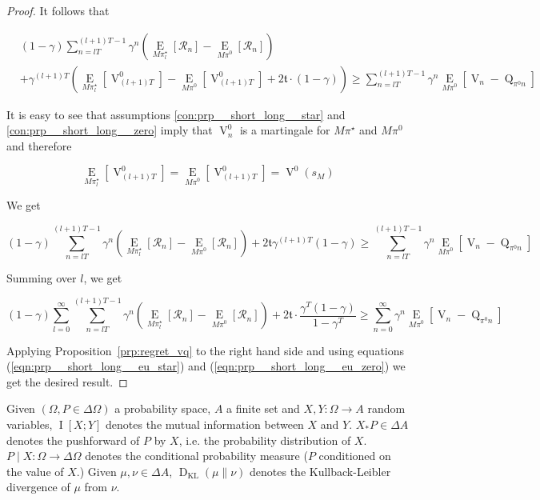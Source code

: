 \documentclass[anon,12pt]{colt2018} %
\newcommand{\Comment}[1]{}
\newcommand{\AP}[1]{\left(#1\right)}
\newcommand{\AB}[1]{\left[#1\right]}
\newcommand{\Ea}[2]{\underset{#1}{\operatorname{E}}\AB{#2}}
\newcommand{\Ia}[2]{\underset{#1}{\operatorname{I}}\AB{#2}}
\newcommand{\KL}[2]{\operatorname{D}_{\mathrm{KL}}(#1 \| #2)}
\newcommand{\R}{\mathcal{R}}
\newcommand{\V}{\operatorname{V}}
\newcommand{\Q}{\operatorname{Q}}
\newcommand{\Tn}{\mathfrak{t}}
\begin{document}
\begin{proof}
It follows that

\begin{align*}
&(1-\gamma)\sum_{n=lT}^{(l+1)T-1} {\gamma^n\AP{\Ea{M\pi^\star_l}{\R_n}-\Ea{M\pi^0}{\R_n}}}\\ 
&+ \gamma^{(l+1)T}\AP{\Ea{M\pi^\star_l}{\V^0_{(l+1)T}}-\Ea{M\pi^0}{\V^0_{(l+1)T}}+2\Tn\cdot(1-\gamma)} \geq \sum_{n=lT}^{(l+1)T-1}{\gamma^n \Ea{M\pi^0}{\V_n-\Q_{\pi^0n}}}
\end{align*}

\Comment{Here, an expected value w.r.t. the difference of two probability measures is understood to mean the corresponding difference of expected values.}

It is easy to see that assumptions \ref{con:prp__short_long__star} and \ref{con:prp__short_long__zero} imply that $\V_n^0$ is a martingale for $M\pi^\star$ and $M\pi^0$ and therefore

$$\Ea{M\pi^\star_l}{\V^0_{(l+1)T}}=\Ea{M\pi^0}{\V^0_{(l+1)T}}=\V^0\AP{s_M}$$

We get

\begin{equation*}
(1-\gamma)\sum_{n=lT}^{(l+1)T-1} {\gamma^n\AP{\Ea{M\pi^\star_l}{\R_n}-\Ea{M\pi^0}{\R_n}}}+ 2\Tn\gamma^{(l+1)T}(1-\gamma) \geq \sum_{n=lT}^{(l+1)T-1}{\gamma^n \Ea{M\pi^0}{\V_n-\Q_{\pi^0n}}} 
\end{equation*}

Summing over $l$, we get

\[(1-\gamma)\sum_{l=0}^\infty\sum_{n=lT}^{(l+1)T-1} {\gamma^n\AP{\Ea{M\pi^\star_l}{\R_n}-\Ea{M\pi^0}{\R_n}}}+ 2\Tn\cdot\frac{\gamma^T(1-\gamma)}{1-\gamma^T} \geq \sum_{n=0}^{\infty}{\gamma^n \Ea{M\pi^0}{\V_n-\Q_{\pi^0n}}} \]

Applying Proposition~\ref{prp:regret_vq} to the right hand side and using equations (\ref{eqn:prp__short_long__eu_star}) and (\ref{eqn:prp__short_long__eu_zero}) we get the desired result.
\end{proof}

Given $(\Omega,P\in\Delta\Omega)$ a probability space, $A$ a finite set and $X,Y: \Omega \rightarrow A$ random variables, $\Ia{}{X;Y}$ denotes the mutual information between $X$ and $Y$. $X_*P\in\Delta A$ denotes the pushforward of $P$ by $X$, i.e. the probability distribution of $X$. $P \mid X: \Omega \rightarrow \Delta\Omega$ denotes the conditional probability measure ($P$ conditioned on the value of $X$.) Given $\mu,\nu \in \Delta A$, $\KL{\mu}{\nu}$ denotes the Kullback-Leibler divergence of $\mu$ from $\nu$.
\end{document}
